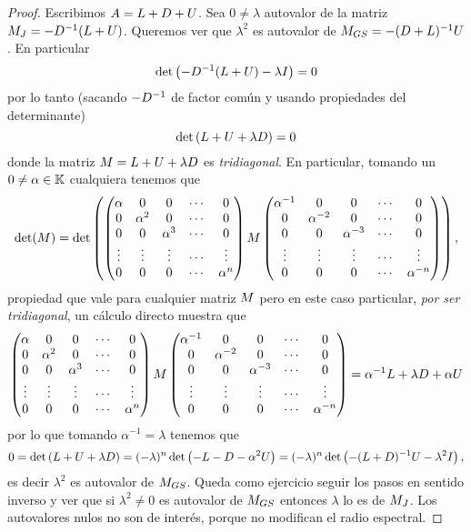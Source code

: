 \begin{proof}
Escribimos $\Ab=\Lb+\Db+\Ub$. Sea $0\neq \lambda$ autovalor de la matriz $\Mb_{J}=-\Db^{-1}(\Lb+\Ub)$. Queremos ver que $\lambda^2$ es autovalor de $\Mb_{GS}=-(\Db +\Lb)^{-1}\Ub$. En particular
$$
\det \left( -\Db^{-1}(\Lb+\Ub)-\lambda \Ib \right) =0
$$ por lo tanto (sacando $-\Db^{-1}$ de factor común y usando propiedades del determinante)
$$\det \left(\Lb+\Ub+\lambda \Db \right) =0$$
donde la matriz $\Mb=\Lb+\Ub+\lambda \Db $ es \emph{tridiagonal}. En particular, tomando un $0\neq\alpha\in \mathbb K$ cualquiera tenemos que 
$$
\det(\Mb)=\det\left(
\begin{pmatrix}
\alpha&0&0&\cdots&0\\
0&\alpha^2&0&\cdots&0\\
0&0&\alpha^3&\cdots&0\\
\vdots&\vdots&\vdots&\cdots&\vdots\\
0&0&0&\cdots&\alpha^{n}
\end{pmatrix}
\Mb
\begin{pmatrix}
\alpha^{-1}&0&0&\cdots&0\\
0&\alpha^{-2}&0&\cdots&0\\
0&0&\alpha^{-3}&\cdots&0\\
\vdots&\vdots&\vdots&\cdots&\vdots\\
0&0&0&\cdots&\alpha^{-n}
\end{pmatrix}\right),
$$
propiedad que vale para cualquier matriz $\Mb$ pero en este caso particular, \emph{por ser tridiagonal}, un cálculo directo muestra que 
$$
\begin{pmatrix}
\alpha&0&0&\cdots&0\\
0&\alpha^2&0&\cdots&0\\
0&0&\alpha^3&\cdots&0\\
\vdots&\vdots&\vdots&\cdots&\vdots\\
0&0&0&\cdots&\alpha^{n}
\end{pmatrix}
\Mb
\begin{pmatrix}
\alpha^{-1}&0&0&\cdots&0\\
0&\alpha^{-2}&0&\cdots&0\\
0&0&\alpha^{-3}&\cdots&0\\
\vdots&\vdots&\vdots&\cdots&\vdots\\
0&0&0&\cdots&\alpha^{-n}
\end{pmatrix}=\alpha^{-1} \Lb+\lambda \Db +\alpha\Ub
$$
por lo que tomando $\alpha^{-1}=\lambda$ tenemos que 
$$0=\det \left(\Lb+\Ub+\lambda \Db \right)=(-\lambda)^n \det \left(-\Lb-\Db -\alpha^2\Ub \right)=(-\lambda)^n \det \left(-(\Lb+\Db)^{-1}\Ub -\lambda^2\Ib \right),$$
es decir $\lambda^2$ es autovalor de $\Mb_{GS}$. Queda como ejercicio seguir los pasos en sentido inverso y ver que si $\lambda^2\neq 0$ es autovalor de $\Mb_{GS}$ entonces
$\lambda$ lo es de $\Mb_{J}$. Los autovalores nulos no son de interés, porque no modifican el radio espectral.
\end{proof}


